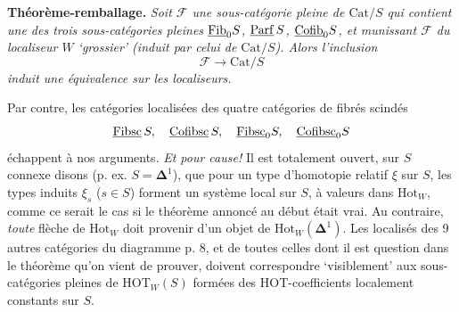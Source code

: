 \textbf{Théorème-remballage.} \textit{Soit $\mathcal{F}$ une sous-catégorie pleine de $\mathrm{Cat}/S$ qui contient une des trois sous-catégories pleines $\underline{\mathrm{Fib}}_0 S$, $\underline{\mathrm{Parf}}\, S$, $\underline{\mathrm{Cofib}}_0 S$, et munissant $\mathcal{F}$ du localiseur $W$ `grossier' (induit par celui de $\mathrm{Cat}/S$). Alors l'inclusion}
\[
\mathcal{F} \longrightarrow \mathrm{Cat}/S
\]
\textit{induit une équivalence sur les localiseurs.}

Par contre, les catégories localisées des quatre catégories de fibrés scindés
\[
\underline{\mathrm{Fibsc}}\, S, \quad \underline{\mathrm{Cofibsc}}\, S, \quad \underline{\mathrm{Fibsc}}_0 S, \quad \underline{\mathrm{Cofibsc}}_0 S
\]
échappent à nos arguments. \textit{Et pour cause!} Il est totalement ouvert, sur $S$ connexe disons (p. ex. $S = \mathbf{\Delta}^1$), que pour un type d'homotopie relatif $\xi$ sur $S$, les types induits $\xi_s$ ($s \in S$) forment un système local sur $S$, à valeurs dans $\mathrm{Hot}_W$, comme ce serait le cas si le théorème annoncé au début était vrai. Au contraire, \textit{toute} flèche de $\mathrm{Hot}_W$ doit provenir d'un objet de $\mathrm{Hot}_W(\mathbf{\Delta}^1)$. Les localisés des 9 autres catégories du diagramme p. 8, et de toutes celles dont il est question dans le théorème qu'on vient de prouver, doivent correspondre `visiblement' aux sous-catégories pleines de $\mathrm{HOT}_W(S)$ formées des HOT-coefficients localement constants sur $S$.

